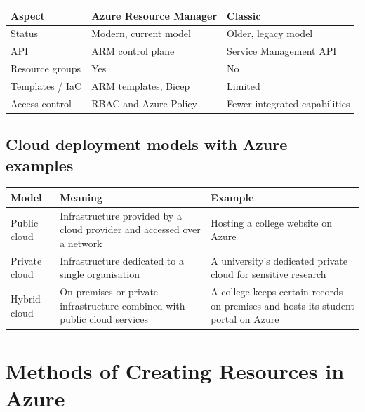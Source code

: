 \documentclass[11pt,a4paper]{article}
\begin{document}
\begin{tabularx}{\textwidth}{@{}lXX@{}}
\toprule
\rowcolor{tablehead}\textbf{Aspect} & \textbf{Azure Resource Manager} & \textbf{Classic} \\
\midrule
Status & Modern, current model & Older, legacy model \\
API & ARM control plane & Service Management API \\
Resource groups & Yes & No \\
Templates / IaC & ARM templates, Bicep & Limited \\
Access control & RBAC and Azure Policy & Fewer integrated capabilities \\
\bottomrule
\end{tabularx}

\subsection{Cloud deployment models with Azure examples}

\begin{tabularx}{\textwidth}{@{}lXX@{}}
\toprule
\rowcolor{tablehead}\textbf{Model} & \textbf{Meaning} & \textbf{Example} \\
\midrule
Public cloud & Infrastructure provided by a cloud provider and accessed over a network &
  Hosting a college website on Azure \\
\addlinespace
Private cloud & Infrastructure dedicated to a single organisation & A university's dedicated
  private cloud for sensitive research \\
\addlinespace
Hybrid cloud & On-premises or private infrastructure combined with public cloud services & A
  college keeps certain records on-premises and hosts its student portal on Azure \\
\bottomrule
\end{tabularx}

\section{Methods of Creating Resources in Azure}


\end{document}
